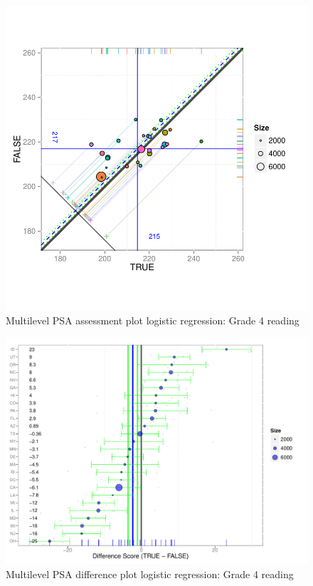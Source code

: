 \begin{figure}[h!]
\begin{center}
\includegraphics[width=\textwidth]{../Figures2009/g4read-mlpsa-lr-circ.pdf}
\caption{Multilevel PSA assessment plot logistic regression: Grade 4 reading}
\end{center}
\end{figure}

\begin{figure}[h!]
\begin{center}
\includegraphics[width=\textwidth]{../Figures2009/g4read-mlpsa-lr-diff.pdf}
\caption{Multilevel PSA difference plot logistic regression: Grade 4 reading}
\end{center}
\end{figure}

